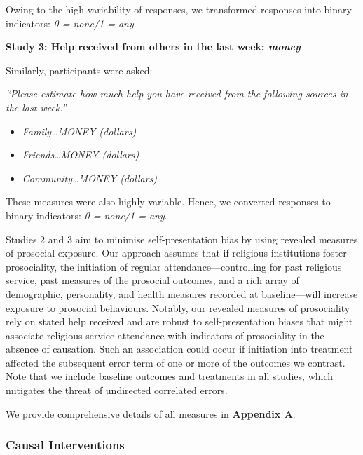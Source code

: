 \documentclass[
  single column]{article}
\providecommand{\tightlist}{%
  \setlength{\itemsep}{0pt}\setlength{\parskip}{0pt}}\usepackage{longtable,booktabs,array}
\begin{document}
Owing to the high variability of responses, we transformed responses
into binary indicators: \emph{0 = none/1 = any}.

\textbf{Study 3: Help received from others in the last week:
\emph{money} }

Similarly, participants were asked:

\emph{``Please estimate how much help you have received from the
following sources in the last week.''}

\begin{itemize}
\tightlist
\item
  \emph{Family\ldots MONEY (dollars)}
\item
  \emph{Friends\ldots MONEY (dollars)}
\item
  \emph{Community\ldots MONEY (dollars)}
\end{itemize}

These measures were also highly variable. Hence, we converted responses
to binary indicators: \emph{0 = none/1 = any}.

Studies 2 and 3 aim to minimise self-presentation bias by using revealed
measures of prosocial exposure. Our approach assumes that if religious
institutions foster prosociality, the initiation of regular
attendance---controlling for past religious service, past measures of
the prosocial outcomes, and a rich array of demographic, personality,
and health measures recorded at baseline---will increase exposure to
prosocial behaviours. Notably, our revealed measures of prosociality
rely on stated help received and are robust to self-presentation biases
that might associate religious service attendance with indicators of
prosociality in the absence of causation. Such an association could
occur if initiation into treatment affected the subsequent error term of
one or more of the outcomes we contrast. Note that we include baseline
outcomes and treatments in all studies, which mitigates the threat of
undirected correlated errors.

We provide comprehensive details of all measures in \textbf{Appendix A}.

\subsubsection{Causal Interventions}\label{causal-interventions}
\end{document}
